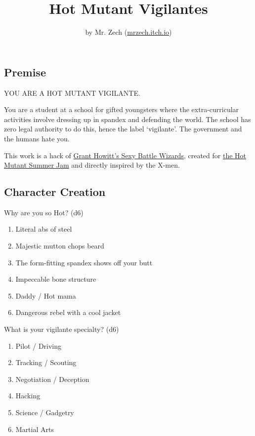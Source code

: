 \documentclass[twocolumn, 11pt
]{article}
\title{Hot Mutant Vigilantes}
\author{by Mr. Zech (\href{https://mrzech.itch.io}{mrzech.itch.io})}
\date{}
\providecommand{\tightlist}{%
  \setlength{\itemsep}{0pt}\setlength{\parskip}{0pt}}
\begin{document}
\maketitle

\hypertarget{premise}{%
\subsection{Premise}\label{premise}}

YOU ARE A HOT MUTANT VIGILANTE.

You are a student at a school for gifted youngsters where the
extra-curricular activities involve dressing up in spandex and defending
the world. The school has zero legal authority to do this, hence the
label `vigilante'. The government and the humans hate you.

This work is a hack of \href{https://gshowitt.itch.io/sexy-battle-wizards}{Grant
Howitt's Sexy Battle Wizards}, created for
\href{https://itch.io/jam/hot-mutant-summer-jam}{the Hot Mutant Summer
Jam} and directly inspired by the X-men.

\hypertarget{character-creation}{%
\subsection{Character Creation}\label{character-creation}}

Why are you so Hot? (d6)

\begin{enumerate}
\def\labelenumi{\arabic{enumi}.}
\tightlist
\item
  Literal abs of steel
\item
  Majestic mutton chops beard
\item
  The form-fitting spandex shows off your butt
\item
  Impeccable bone structure
\item
  Daddy / Hot mama
\item
  Dangerous rebel with a cool jacket
\end{enumerate}

What is your vigilante specialty? (d6)

\begin{enumerate}
\def\labelenumi{\arabic{enumi}.}
\tightlist
\item
  Pilot / Driving
\item
  Tracking / Scouting
\item
  Negotiation / Deception
\item
  Hacking
\item
  Science / Gadgetry
\item
  Martial Arts
\end{enumerate}
\end{document}
